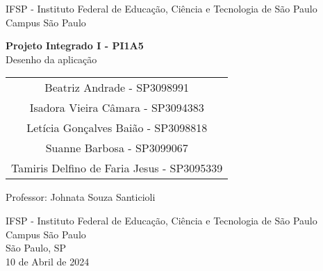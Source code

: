 \documentclass[
    12pt,               %
    openright,          %
    oneside,
    a4paper,            %
    hyphens,
    paginasA3,  %
    GLOSSARIO, %
    TODO, %
    english,            %
    brazil           %
    ]{regras-pi1a5} %
\begin{document}
\frenchspacing 

\newpage

\pretextual


\newcommand{\todonum}[2][]
{\stepcounter{todocounter}\todo[#1]{\thetodocounter: #2}}






\begin{titlepage}
    \begin{center}
        \vspace*{1cm}
        
        {\Large{IFSP - Instituto Federal de Educação, Ciência e Tecnologia de São Paulo}} \\
        \vspace{0.2cm}
        {\large{Campus São Paulo}}
        
        \vspace{6cm}
    
        
        \textbf{\LARGE{Projeto Integrado I - PI1A5}}\\
        \vspace{0.2cm}
        {\large{Desenho da aplicação}}
        
        \vspace{1.5cm}
        
        \begin{tabular}{c}
            {\large Beatriz Andrade - SP3098991} \\
            {\large Isadora Vieira Câmara - SP3094383} \\
            {\large Letícia Gonçalves Baião - SP3098818} \\
            {\large Suanne Barbosa - SP3099067} \\
            {\large Tamiris Delfino de Faria Jesus - SP3095339} \\
        \end{tabular}
        
        \vspace{1.5cm}
        
        {\large Professor: Johnata Souza Santicioli} \\


        \vfill
        
        \large{IFSP - Instituto Federal de Educação, Ciência e Tecnologia de São Paulo \\
        Campus São Paulo \\
        São Paulo, SP \\
        10 de Abril de 2024}
        
    \end{center}
\end{titlepage}
\end{document}

